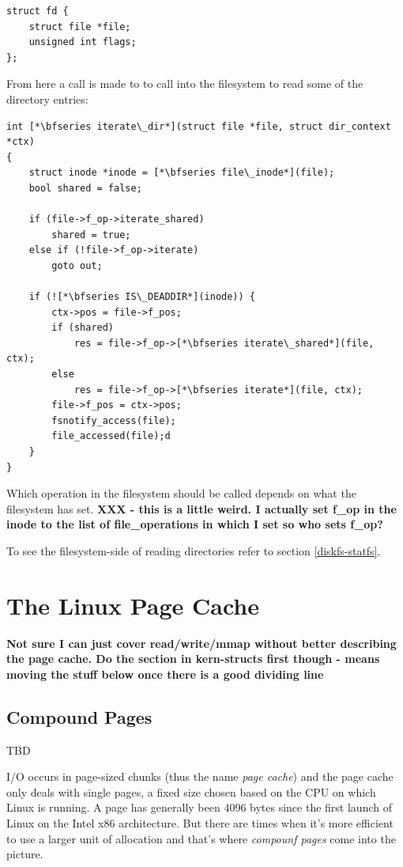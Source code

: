 \begin{lstlisting}
struct fd {
	struct file *file;
	unsigned int flags;
};
\end{lstlisting}

\noindent
From here a call is made to  to call into the filesystem to read some of the directory entries:

\begin{lstlisting}
int [*\bfseries iterate\_dir*](struct file *file, struct dir_context *ctx)
{   
    struct inode *inode = [*\bfseries file\_inode*](file);
    bool shared = false;

    if (file->f_op->iterate_shared)
        shared = true;
    else if (!file->f_op->iterate)
        goto out;

    if (![*\bfseries IS\_DEADDIR*](inode)) {
        ctx->pos = file->f_pos;
        if (shared)
            res = file->f_op->[*\bfseries iterate\_shared*](file, ctx);
        else
            res = file->f_op->[*\bfseries iterate*](file, ctx);
        file->f_pos = ctx->pos;
        fsnotify_access(file);
        file_accessed(file);d
    }
}
\end{lstlisting}

\noindent
Which operation in the filesystem should be called depends on what the filesystem has set. \textbf{XXX - this is a little weird. I actually set f\_op in the inode to the list of file\_operations in which I set  so who sets f\_op?}

To see the filesystem-side of reading directories refer to section \ref{diskfs-statfs}.


\section{The Linux Page Cache}

\textbf{Not sure I can just cover read/write/mmap without better describing the page cache. Do the section in kern-structs first though - means moving the stuff below once there is a good dividing line}

\subsection{Compound Pages}

TBD

I/O occurs in page-sized chunks (thus the name \textit{page cache}) and the page cache only deals with single pages, a fixed size chosen based on the CPU on which Linux is running. A page has generally been 4096 bytes since the first launch of Linux on the Intel x86 architecture. But there are times when it's more efficient to use a larger unit of allocation and that's where \textit{compounf pages} come into the picture.

